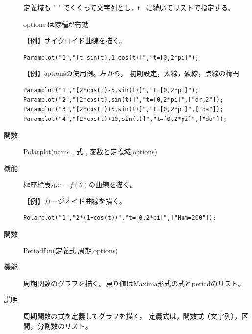 \documentclass[papersize,a4paper,12pt,uplatex]{jsarticle}
\begin{document}
\begin{description}
定義域も " " でくくって文字列とし，t=に続いてリストで指定する。

options は線種が有効

\vspace{\baselineskip}
【例】サイクロイド曲線を描く。

\hspace{10mm} \verb|Paramplot("1","[t-sin(t),1-cos(t)]","t=[0,2*pi]");|

\vspace{\baselineskip}
\hspace{20mm}

\vspace{\baselineskip}
【例】optionsの使用例。左から， 初期設定，太線，破線，点線の楕円
\begin{verbatim}
Paramplot("1","[2*cos(t)-5,sin(t)]","t=[0,2*pi]");
Paramplot("2","[2*cos(t),sin(t)]","t=[0,2*pi]",["dr,2"]);
Paramplot("3","[2*cos(t)+5,sin(t)]","t=[0,2*pi]",["da"]);
Paramplot("4","[2*cos(t)+10,sin(t)]","t=[0,2*pi]",["do"]);
\end{verbatim}
\begin{center}  \end{center}


\vspace{\baselineskip}
\hypertarget{polarplot}{}
\item[関数]Polarplot(name , 式 , 変数と定義域,options)
\item[機能]極座標表示$r=f(\theta)$の曲線を描く。

\vspace{\baselineskip}
【例】カージオイド曲線を描く。

\hspace{10mm}\verb|Polarplot("1","2*(1+cos(t))","t=[0,2*pi]",["Num=200"]);|

\vspace{\baselineskip}
\begin{center}\scalebox{0.7}{}\end{center}

\vspace{\baselineskip}
\hypertarget{periodfun}{}
\item[関数]Periodfun(定義式,周期,options)
\item[機能]周期関数のグラフを描く。戻り値はMaxima形式の式とperiodのリスト。
\item[説明]周期関数の式を定義してグラフを描く。
定義式は，関数式（文字列），区間，分割数のリスト。


\end{description}
\end{document}
